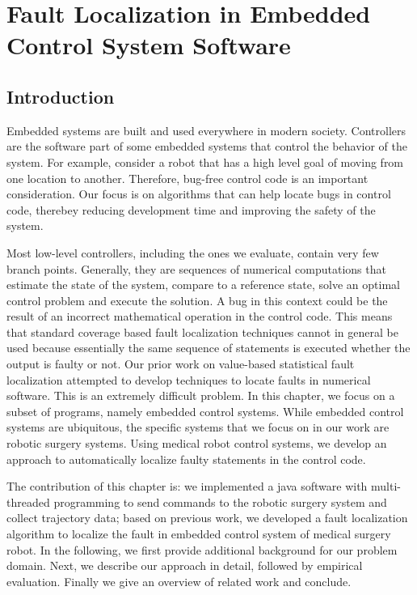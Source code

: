 \chapter{Fault Localization in Embedded Control System Software}\label{robot}

\section{Introduction}
Embedded systems are built and used everywhere in modern society. Controllers are the software part of some embedded systems
that control the behavior of the system. For example, consider a robot that has a high level goal of moving from one location to another. Therefore, bug-free control code is an important consideration. Our focus
is on algorithms that can help locate bugs in control code,
therebey reducing development time and improving the safety
of the system.  

Most low-level controllers, including the ones we evaluate, contain very few branch points. Generally, they are sequences of numerical computations that estimate the state of the system, compare to a reference state, solve an
optimal control problem and execute the solution. A bug in this context could be the result of an incorrect mathematical operation in the control code. This means that standard coverage
based fault localization techniques cannot in general be used because essentially the same sequence of statements is executed whether the output is faulty or not. Our prior work on value-based statistical fault localization attempted to develop techniques to locate faults  in numerical software. This is an extremely difficult problem. In this chapter, we focus on a subset of programs, namely embedded control systems. While embedded control systems are ubiquitous, the specific systems that we focus on in our work are robotic surgery systems. Using medical robot control systems, we develop an approach to automatically localize faulty statements in the control code.

The contribution of this chapter is: we implemented a java software with multi-threaded programming to send commands to the robotic surgery system and collect trajectory data; based on previous work, we developed a fault localization algorithm to localize the fault in embedded control system of medical surgery robot. In the following, we first provide additional background for our problem domain. Next, we describe our approach in detail, followed by empirical evaluation. Finally we give an overview of related work and conclude.

